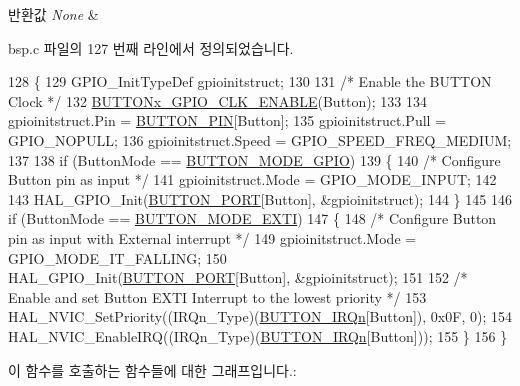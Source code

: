 \begin{DoxyRetVals}{반환값}
{\em None} & \\
\hline
\end{DoxyRetVals}


bsp.\+c 파일의 127 번째 라인에서 정의되었습니다.


\begin{DoxyCode}
128 \{
129   GPIO\_InitTypeDef gpioinitstruct;
130 
131   \textcolor{comment}{/* Enable the BUTTON Clock */}
132   \mbox{\hyperlink{_lory_s_d_k__hw__conf_8h_aa397abaece51f4d7aafb07fd79640f3e}{BUTTONx\_GPIO\_CLK\_ENABLE}}(Button);
133 
134   gpioinitstruct.Pin = \mbox{\hyperlink{bsp_8c_adf78f2d71408a01f8d30929c2d2da82b}{BUTTON\_PIN}}[Button];
135   gpioinitstruct.Pull = GPIO\_NOPULL;
136   gpioinitstruct.Speed = GPIO\_SPEED\_FREQ\_MEDIUM;
137 
138   \textcolor{keywordflow}{if} (ButtonMode == \mbox{\hyperlink{_lory_s_d_k__hw__conf_8h_a48825b7c7d851c440ef8e808fd9d8f0aa9411f3542831027b24c493abfb998522}{BUTTON\_MODE\_GPIO}})
139   \{
140     \textcolor{comment}{/* Configure Button pin as input */}
141     gpioinitstruct.Mode   = GPIO\_MODE\_INPUT;
142   
143     HAL\_GPIO\_Init(\mbox{\hyperlink{bsp_8c_ad63ed42b4071e78f80f7462227da4f35}{BUTTON\_PORT}}[Button], &gpioinitstruct);
144   \}
145  
146   \textcolor{keywordflow}{if} (ButtonMode == \mbox{\hyperlink{_lory_s_d_k__hw__conf_8h_a48825b7c7d851c440ef8e808fd9d8f0aa13c1ad97bc3db33d7f2b5a7c116bc8f5}{BUTTON\_MODE\_EXTI}})
147   \{
148     \textcolor{comment}{/* Configure Button pin as input with External interrupt */}
149     gpioinitstruct.Mode   = GPIO\_MODE\_IT\_FALLING; 
150     HAL\_GPIO\_Init(\mbox{\hyperlink{bsp_8c_ad63ed42b4071e78f80f7462227da4f35}{BUTTON\_PORT}}[Button], &gpioinitstruct);
151 
152     \textcolor{comment}{/* Enable and set Button EXTI Interrupt to the lowest priority */}
153     HAL\_NVIC\_SetPriority((IRQn\_Type)(\mbox{\hyperlink{bsp_8c_a13c3e27c584df9fccc4697dd535ea1cd}{BUTTON\_IRQn}}[Button]), 0x0F, 0);
154     HAL\_NVIC\_EnableIRQ((IRQn\_Type)(\mbox{\hyperlink{bsp_8c_a13c3e27c584df9fccc4697dd535ea1cd}{BUTTON\_IRQn}}[Button]));
155   \}
156 \}
\end{DoxyCode}
이 함수를 호출하는 함수들에 대한 그래프입니다.\+:
\mbox{\label{group___s_t_m32_l1_x_x___n_u_c_l_e_o___b_u_t_t_o_n___functions_ga42c7cbbf0254f5f11135797d083bcb2c}} 
